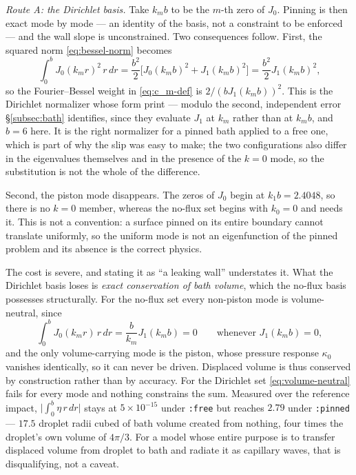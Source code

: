 \emph{Route A: the Dirichlet basis.} Take $k_mb$ to be the $m$-th zero of $J_0$. Pinning is then exact mode by mode --- an identity of the basis, not a constraint to be enforced --- and the wall slope is unconstrained. Two consequences follow. First, the squared norm \eqref{eq:bessel-norm} becomes
\begin{equation}
    \int_0^bJ_0(k_mr)^2\,r\,dr = \frac{b^2}{2}\Big[J_0(k_mb)^2+J_1(k_mb)^2\Big] = \frac{b^2}{2}J_1(k_mb)^2\text{,}
    \label{eq:bessel-norm-pinned}
\end{equation}
so the Fourier--Bessel weight in \eqref{eq:c_m-def} is $2/(bJ_1(k_mb))^2$. This is the Dirichlet normalizer whose form \cite{AlventosaEtAl2023} print --- modulo the second, independent error \S\ref{subsec:bath} identifies, since they evaluate $J_1$ at $k_m$ rather than at $k_mb$, and $b=6$ here. It is the right normalizer for a pinned bath applied to a free one, which is part of why the slip was easy to make; the two configurations also differ in the eigenvalues themselves and in the presence of the $k=0$ mode, so the substitution is not the whole of the difference.

Second, the piston mode disappears. The zeros of $J_0$ begin at $k_1b=2.4048$, so there is no $k=0$ member, whereas the no-flux set begins with $k_0=0$ and needs it. This is not a convention: a surface pinned on its entire boundary cannot translate uniformly, so the uniform mode is not an eigenfunction of the pinned problem and its absence is the correct physics.

The cost is severe, and stating it as ``a leaking wall'' understates it. What the Dirichlet basis loses is \emph{exact conservation of bath volume}, which the no-flux basis possesses structurally. For the no-flux set every non-piston mode is volume-neutral, since
\begin{equation}
    \int_0^bJ_0(k_mr)\,r\,dr = \frac{b}{k_m}J_1(k_mb) = 0\qquad\text{whenever }J_1(k_mb)=0\text{,}
    \label{eq:volume-neutral}
\end{equation}
and the only volume-carrying mode is the piston, whose pressure response $\kappa_0$ vanishes identically, so it can never be driven. Displaced volume is thus conserved by construction rather than by accuracy. For the Dirichlet set \eqref{eq:volume-neutral} fails for every mode and nothing constrains the sum. Measured over the reference impact, $\big|\int_0^b\eta\,r\,dr\big|$ stays at $5\times10^{-15}$ under \texttt{:free} but reaches $2.79$ under \texttt{:pinned} --- $17.5$ droplet radii cubed of bath volume created from nothing, four times the droplet's own volume of $4\pi/3$. For a model whose entire purpose is to transfer displaced volume from droplet to bath and radiate it as capillary waves, that is disqualifying, not a caveat.

